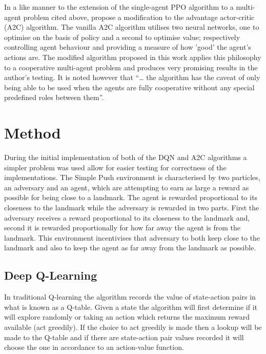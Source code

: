 \documentclass{article}
\begin{document}
In a like manner to the extension of the single-agent PPO algorithm to a multi-agent problem cited above, \citet{9263738} propose a modification to the advantage actor-critic (A2C) algorithm.
The vanilla A2C algorithm utilises two neural networks, one to optimise on the basis of policy and a second to optimise value; respectively controlling agent behaviour and providing a measure of how 'good' the agent's actions are.
The modified algorithm proposed in this work applies this philosophy to a cooperative multi-agent problem and produces very promising results in the author's testing.
It is noted however that “… the algorithm has the caveat of only being able to be used when the agents are fully cooperative without any special predefined roles between them”. \citet{terry2020pettingzoo}

\section{Method} \label{Method}

During the initial implementation of both of the DQN and A2C algorithms a simpler problem was used allow for easier testing for correctness of the implementations.
The Simple Push environment is characterised by two particles, an adversary and an agent, which are attempting to earn as large a reward as possible for being close to a landmark.
The agent is rewarded proportional to its closeness to the landmark while the adversary is rewarded in two parts.
First the adversary receives a reward proportional to its closeness to the landmark and, second it is rewarded proportionally for how far away the agent is from the landmark.
This environment incentivises that adversary to both keep close to the landmark and also to keep the agent as far away from the landmark as possible.



\subsection{Deep Q-Learning} \label{DQN-Method}

In traditional Q-learning the algorithm records the value of state-action pairs in what is known as a Q-table.
Given a state the algorithm will first determine if it will explore randomly or taking an action which returns the maximum reward available (act greedily).
If the choice to act greedily is made then a lookup will be made to the Q-table and if there are state-action pair values recorded it will choose the one in accordance to an action-value function.
\end{document}
